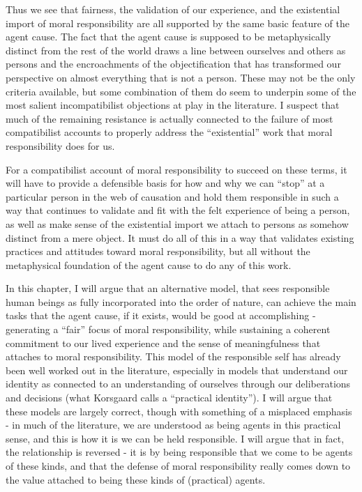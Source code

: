 \documentclass[phd,12pt,oneside,paper=letterpaper]{ubcthesis}
\begin{document}
Thus we see that fairness, the validation of our experience, and the existential import of moral responsibility are all supported by the same basic feature of the agent cause. The fact that the agent cause is supposed to be metaphysically distinct from the rest of the world draws a line between ourselves and others as persons and the encroachments of the objectification that has transformed our perspective on almost everything that is not a person. These may not be the only criteria available, but some combination of them do seem to underpin some of the most salient incompatibilist objections at play in the literature.  I suspect that much of the remaining resistance is actually connected to the failure of most compatibilist accounts to properly address the ``existential'' work that moral responsibility does for us. 

For a compatibilist account of moral responsibility to succeed on these terms, it will have to provide a defensible basis for how and why we can ``stop'' at a particular person in the web of causation and hold them responsible in such a way that continues to validate and fit with the felt experience of being a person, as well as make sense of the existential import we attach to persons as somehow distinct from a mere object. It must do all of this in a way that validates existing practices and attitudes toward moral responsibility, but all without the metaphysical foundation of the agent cause to do any of this work. 

In this chapter, I will argue that an alternative model, that sees responsible human beings as fully incorporated into the order of nature, can achieve the main tasks that the agent cause, if it exists, would be good at accomplishing - generating a ``fair'' focus of moral responsibility, while sustaining a coherent commitment to our lived experience and the sense of meaningfulness that attaches to moral responsibility. This model of the responsible self has already been well worked out in the literature, especially in models that understand our identity as connected to an understanding of ourselves through our deliberations and decisions (what Korsgaard \citeyearpar{korsgaard1996, korsgaard2009} calls a ``practical identity''). I will argue that these models are largely correct, though with something of a misplaced emphasis - in much of the literature, we are understood as being agents in this practical sense, and this is how it is we can be held responsible. I will argue that in fact, the relationship is reversed - it is by being responsible that we come to be agents of these kinds, and that the defense of moral responsibility really comes down to the value attached to being these kinds of (practical) agents. 
\end{document}
